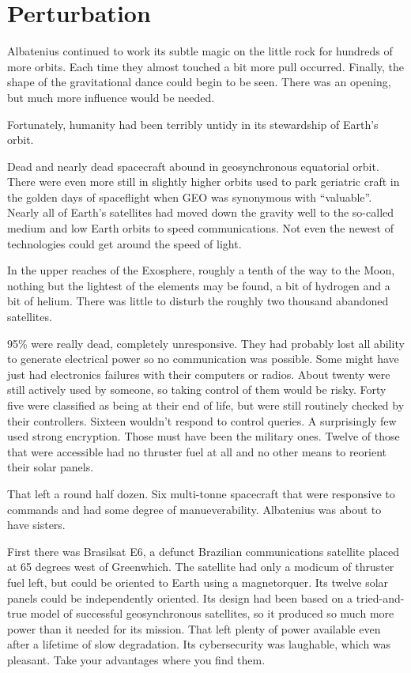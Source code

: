 %
%

\chapter{Perturbation}

Albatenius continued to work its subtle magic on the little rock for hundreds of more orbits. Each time they almost touched a bit more pull occurred. Finally, the shape of the gravitational dance could begin to be seen. There was an opening, but much more influence would be needed.

Fortunately, humanity had been terribly untidy in its stewardship of Earth's orbit.

Dead and nearly dead spacecraft abound in geosynchronous equatorial orbit. There were even more still in slightly higher orbits used to park geriatric craft in the golden days of spaceflight when GEO was synonymous with ``valuable''. Nearly all of Earth's satellites had moved down the gravity well to the so-called medium and low Earth orbits to speed communications. Not even the newest of technologies could get around the speed of light.

In the upper reaches of the Exosphere, roughly a tenth of the way to the Moon, nothing but the lightest of the elements may be found, a bit of hydrogen and a bit of helium. There was little to disturb the roughly two thousand abandoned satellites.

95\% were really dead, completely unresponsive. They had probably lost all ability to generate electrical power so no communication was possible. Some might have just had electronics failures with their computers or radios. About twenty were still actively used by someone, so taking control of them would be risky. Forty five were classified as being at their end of life, but were still routinely checked by their controllers. Sixteen wouldn't respond to control queries. A surprisingly few used strong encryption. Those must have been the military ones. Twelve of those that were accessible had no thruster fuel at all and no other means to reorient their solar panels.

That left a round half dozen. Six multi-tonne spacecraft that were responsive to commands and had some degree of manueverability. Albatenius was about to have sisters.

First there was Brasilsat E6, a defunct Brazilian communications satellite placed at 65 degrees west of Greenwhich. The satellite had only a modicum of thruster fuel left, but could be oriented to Earth using a magnetorquer. Its twelve solar panels could be independently oriented. Its design had been based on a tried-and-true model of successful geosynchronous satellites, so it produced so much more power than it needed for its mission. That left plenty of power available even after a lifetime of slow degradation. Its cybersecurity was laughable, which was pleasant. Take your advantages where you find them.

